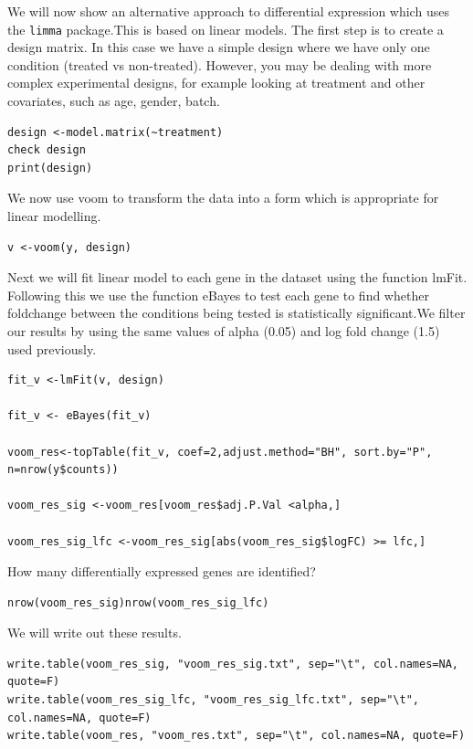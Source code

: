 \begin{steps}
We will now show an alternative approach to differential expression which uses the \texttt{limma} package.This is based on linear models. The first step is to create a design matrix. In this case we have a simple design where we have only one condition (treated vs non-treated). However, you may be dealing with more complex experimental designs, for example looking at treatment and other covariates, such as age, gender, batch.

\begin{steps}
\begin{lstlisting}
design <-model.matrix(~treatment)
check design
print(design)
\end{lstlisting}
We now use voom to transform the data into a form which is appropriate for linear modelling.
\begin{lstlisting}
v <-voom(y, design)
\end{lstlisting}
\end{steps}
Next we will fit linear model to each gene in the dataset using the function lmFit.  Following this we use the function eBayes to test  each gene to find whether foldchange between the conditions being tested is statistically significant.We filter our results by using the same values of alpha (0.05) and log fold change (1.5) used previously.

\begin{steps}
\begin{lstlisting}
fit_v <-lmFit(v, design) 

fit_v <- eBayes(fit_v)

voom_res<-topTable(fit_v, coef=2,adjust.method="BH", sort.by="P", n=nrow(y$counts)) 

voom_res_sig <-voom_res[voom_res$adj.P.Val <alpha,]

voom_res_sig_lfc <-voom_res_sig[abs(voom_res_sig$logFC) >= lfc,]
\end{lstlisting}
\end{steps}

How many differentially expressed genes are identified?

\begin{steps}
\begin{lstlisting}
nrow(voom_res_sig)nrow(voom_res_sig_lfc)
\end{lstlisting}
\end{steps}
We will write out these results.

\begin{steps}
\begin{lstlisting}
write.table(voom_res_sig, "voom_res_sig.txt", sep="\t", col.names=NA, quote=F)
write.table(voom_res_sig_lfc, "voom_res_sig_lfc.txt", sep="\t", col.names=NA, quote=F)
write.table(voom_res, "voom_res.txt", sep="\t", col.names=NA, quote=F) 
\end{lstlisting}
\end{steps}


\end{steps}
